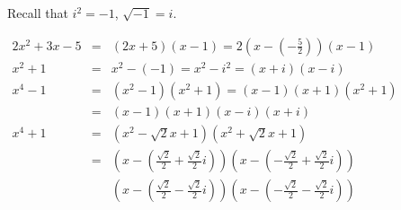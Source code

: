\begin{frame}
Recall that $i^2=-1$, $\sqrt{-1}=i$.
\begin{example}
$
\renewcommand{\arraystretch}{2}
\begin{array}{rcl}
2x^2+3x-5&=&(2x+5)(x-1)= 2\left(x-\left(-\frac{5 }{2}\right)\right)(x-1)\\
x^2+1&=&x^2-(-1)=x^2-i^2=(x+i)(x-i)\\
x^4-1&=&(x^2-1)(x^2+1)=(x-1)(x+1)(x^2+1)\\
&=& (x-1)(x+1)(x-i)(x+i) \\
x^4+1&=&(x^2-\sqrt{2}x+1)(x^2+\sqrt{2}x+1)\\
&=&
\left(x-\left(\frac{\sqrt{2}}{2}+\frac{\sqrt{2}}{2}i\right)\right)
\left(x-\left(-\frac{\sqrt{2}}{2}+\frac{\sqrt{2}}{2}i\right)\right)\\&&
\left(x-\left(\frac{\sqrt{2}}{2}-\frac{\sqrt{2}}{2}i\right)\right)
\left(x-\left(-\frac{\sqrt{2}}{2}-\frac{\sqrt{2}}{2}i\right)\right)
\end{array}$
\end{example}

 \end{frame}